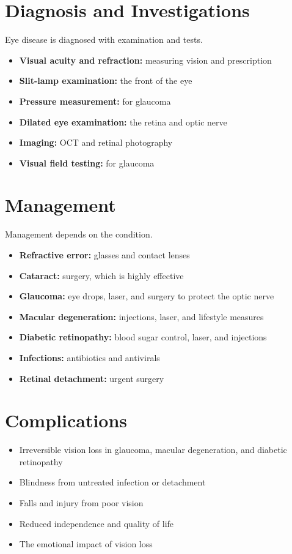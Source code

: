 \section*{Diagnosis and Investigations}
Eye disease is diagnosed with examination and tests.
\begin{itemize}
    \item \textbf{Visual acuity and refraction:} measuring vision and prescription
    \item \textbf{Slit-lamp examination:} the front of the eye
    \item \textbf{Pressure measurement:} for glaucoma
    \item \textbf{Dilated eye examination:} the retina and optic nerve
    \item \textbf{Imaging:} OCT and retinal photography
    \item \textbf{Visual field testing:} for glaucoma
\end{itemize}

\section*{Management}
Management depends on the condition.
\begin{itemize}
    \item \textbf{Refractive error:} glasses and contact lenses
    \item \textbf{Cataract:} surgery, which is highly effective
    \item \textbf{Glaucoma:} eye drops, laser, and surgery to protect the optic nerve
    \item \textbf{Macular degeneration:} injections, laser, and lifestyle measures
    \item \textbf{Diabetic retinopathy:} blood sugar control, laser, and injections
    \item \textbf{Infections:} antibiotics and antivirals
    \item \textbf{Retinal detachment:} urgent surgery
\end{itemize}

\section*{Complications}
\begin{itemize}
    \item Irreversible vision loss in glaucoma, macular degeneration, and diabetic retinopathy
    \item Blindness from untreated infection or detachment
    \item Falls and injury from poor vision
    \item Reduced independence and quality of life
    \item The emotional impact of vision loss
\end{itemize}

